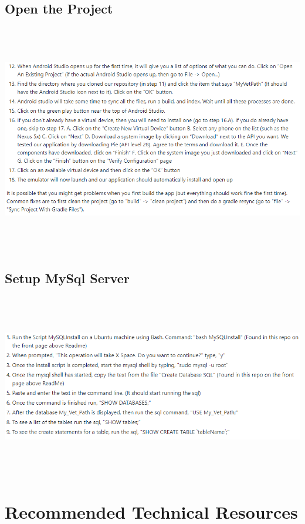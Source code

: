\documentclass[onecolumn, draftclsnofoot,10pt, compsoc]{IEEEtran}
\begin{document}
\subsection{Open the Project} 
\begin{center}
\includegraphics[height=10cm, width=18cm]{OpenProject.png}
\end{center}


\subsection{Setup MySql Server} 
\begin{center}
\includegraphics[height=8cm, width=18cm]{MySQLscript.PNG}
\end{center}


 \section{Recommended Technical Resources}
\end{document}
